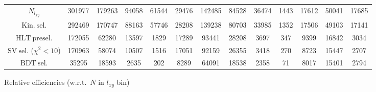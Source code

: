 \documentclass[10pt,a4paper]{article}
\begin{document}
\begin{landscape}
{\begin{tabular}{c|cccc|cccc|cccc}
\midrule
$N_{l_{xy}}$ & 301977 & 179263 & 94058 & 61544 & 29476 & 142485 & 84528 & 36474 & 1443 & 17612 & 50041 & 17685\\
$\mathrm{Kin.\ sel.}$ & 292469 & 170747 & 88163 & 57746 & 28208 & 139238 & 80703 & 33985 & 1352 & 17506 & 49103 & 17141\\
$\mathrm{HLT\ presel.}$ & 172055 & 62280 & 13597 & 1829 & 17289 & 93441 & 28208 & 3697 & 347 & 9399 & 16842 & 3034\\
$\mathrm{SV\ sel.}$ ($\chi^2{<}10$) & 170963 & 58074 & 10507 & 1516 & 17051 & 92159 & 26355 & 3418 & 270 & 8723 & 15447 & 2707\\
$\mathrm{BDT\ sel.}$ & 35295 & 18593 & 2635 & 202 & 8289 & 64091 & 18538 & 2358 & 71 & 8017 & 15401 & 2794\\
\bottomrule
\end{tabular}}

\vspace{18pt}

Relative efficiencies (w.r.t.\ $N$ in $l_{xy}$ bin)


\end{landscape}
\end{document}
